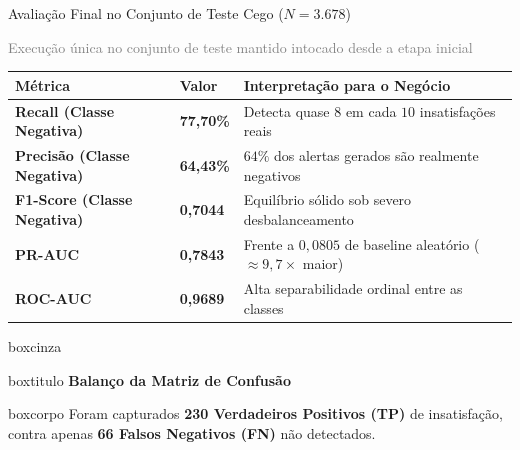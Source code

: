 \documentclass[aspectratio=43]{beamer}
\begin{document}
\begin{frame}[t]{Avaliação Final no Conjunto de Teste Cego ($N = 3.678$)}

\textcolor{gray}{\small Execução única no conjunto de teste mantido intocado desde a etapa inicial}

\vspace{0.08cm}

\scriptsize
\renewcommand{\arraystretch}{1.12}
\begin{center}
\begin{tabular}{P{3.2cm} P{1.4cm} P{4.4cm}}
\toprule
\textbf{Métrica} & \textbf{Valor} & \textbf{Interpretação para o Negócio} \\
\midrule
\textbf{Recall (Classe Negativa)} & \textbf{77,70\%} & Detecta quase $8$ em cada $10$ insatisfações reais \\
\textbf{Precisão (Classe Negativa)} & \textbf{64,43\%} & $64\%$ dos alertas gerados são realmente negativos \\
\textbf{F1-Score (Classe Negativa)} & \textbf{0,7044} & Equilíbrio sólido sob severo desbalanceamento \\
\textbf{PR-AUC} & \textbf{0,7843} & Frente a $0{,}0805$ de baseline aleatório ($\approx 9{,}7\times$ maior) \\
\textbf{ROC-AUC} & \textbf{0,9689} & Alta separabilidade ordinal entre as classes \\
\bottomrule
\end{tabular}
\end{center}

\vspace{0.04cm}

\begin{center}
\begin{beamercolorbox}[wd=0.96\textwidth, sep=0pt]{boxcinza}
  \begin{beamercolorbox}[wd=0.96\textwidth, ht=0.38cm, dp=0.06cm, leftskip=0.2cm]{boxtitulo}
    {\color{uelgreen}\scriptsize\textbf{Balanço da Matriz de Confusão}}
  \end{beamercolorbox}
  \begin{beamercolorbox}[wd=0.96\textwidth, sep=0.14cm]{boxcorpo}
    \scriptsize Foram capturados \textbf{230 Verdadeiros Positivos (TP)} de insatisfação, contra apenas \textbf{66 Falsos Negativos (FN)} não detectados.
  \end{beamercolorbox}
\end{beamercolorbox}
\end{center}

\end{frame}
\end{document}
